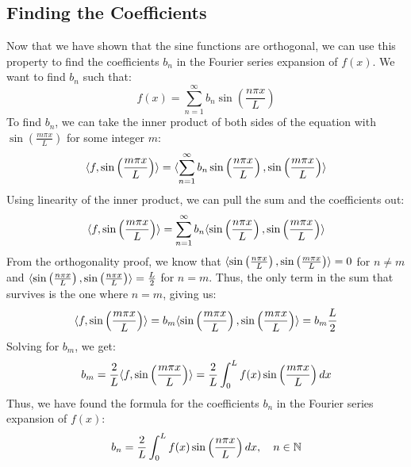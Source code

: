 \subsection{Finding the Coefficients}\label{subsec.finding_coeffs}
Now that we have shown that the sine functions are orthogonal, we can use this property to find the coefficients $b_n$ in the Fourier series expansion of $f(x)$. We want to find $b_n$ such that:
\[
f(x) = \sum_{n=1}^\infty b_n \sin\left(\frac{n \pi x}{L}\right)
\]
To find $b_n$, we can take the inner product of both sides of the equation with $\sin\left(\frac{m \pi x}{L}\right)$ for some integer $m$:
\[
\inner{f}{\sin \tup{\frac{m \pi x}{L}}} = \inner{\sum_{n=1}^\infty b_n \sin\left(\frac{n \pi x}{L}\right)}{\sin \tup{\frac{m \pi x}{L}}}
\]
Using linearity of the inner product, we can pull the sum and the coefficients out:
\[
\inner{f}{\sin \tup{\frac{m \pi x}{L}}} = \sum_{n=1}^\infty b_n \inner{\sin\left(\frac{n \pi x}{L}\right)}{\sin \tup{\frac{m \pi x}{L}}}
\]
From the orthogonality proof, we know that $\langle \sin\left(\frac{n \pi x}{L}\right), \sin \left( \frac{m \pi x}{L} \right) \rangle = 0$ for $n \neq m$ and $\langle \sin\left(\frac{n \pi x}{L}\right), \sin \left( \frac{n \pi x}{L} \right) \rangle = \frac{L}{2}$ for $n = m$. Thus, the only term in the sum that survives is the one where $n = m$, giving us:
\[
\langle f, \sin \left( \frac{m \pi x}{L} \right) \rangle = b_m \langle \sin\left(\frac{m \pi x}{L}\right), \sin \left( \frac{m \pi x}{L} \right) \rangle = b_m \frac{L}{2}
\]
Solving for $b_m$, we get:
\[
b_m = \frac{2}{L} \langle f, \sin \left( \frac{m \pi x}{L} \right) \rangle = \frac{2}{L} \int_0^L f(x) \sin\left(\frac{m \pi x}{L}\right) dx
\]
Thus, we have found the formula for the coefficients $b_n$ in the Fourier series expansion of $f(x)$:
\[
b_n = \frac{2}{L} \int_0^L f(x) \sin\left(\frac{n \pi x}{L}\right) dx, \quad n \in \mathbb{N}
\]